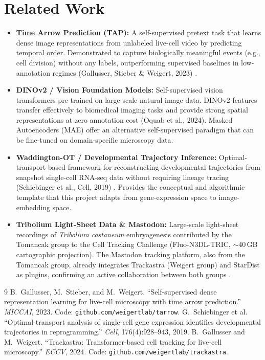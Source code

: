 \documentclass{article}
\begin{document}
\section*{Related Work}
\begin{itemize}
	\item \textbf{Time Arrow Prediction (TAP):} A self-supervised pretext task that learns dense image representations from unlabeled live-cell video by predicting temporal order. Demonstrated to capture biologically meaningful events (e.g., cell division) without any labels, outperforming supervised baselines in low-annotation regimes (Gallusser, Stieber \& Weigert, 2023) \cite{tap}.
	\item \textbf{DINOv2 / Vision Foundation Models:} Self-supervised vision transformers pre-trained on large-scale natural image data. DINOv2 features transfer effectively to biomedical imaging tasks and provide strong spatial representations at zero annotation cost (Oquab et al., 2024). Masked Autoencoders (MAE) offer an alternative self-supervised paradigm that can be fine-tuned on domain-specific microscopy data.
	\item \textbf{Waddington-OT / Developmental Trajectory Inference:} Optimal-transport-based framework for reconstructing developmental trajectories from snapshot single-cell RNA-seq data without requiring lineage tracing (Schiebinger et al., Cell, 2019) \cite{wot}. Provides the conceptual and algorithmic template that this project adapts from gene-expression space to image-embedding space.
	\item \textbf{Tribolium Light-Sheet Data \& Mastodon:} Large-scale light-sheet recordings of \textit{Tribolium castaneum} embryogenesis contributed by the Tomancak group to the Cell Tracking Challenge (Fluo-N3DL-TRIC, $\sim$40\,GB cartographic projection). The Mastodon tracking platform, also from the Tomancak group, already integrates Trackastra (Weigert group) and StarDist as plugins, confirming an active collaboration between both groups \cite{trackastra}.
\end{itemize}

\begin{thebibliography}{9}
	 B.~Gallusser, M.~Stieber, and M.~Weigert. ``Self-supervised dense representation learning for live-cell microscopy with time arrow prediction.'' \textit{MICCAI}, 2023. Code: \texttt{github.com/weigertlab/tarrow}.
	 G.~Schiebinger et al. ``Optimal-transport analysis of single-cell gene expression identifies developmental trajectories in reprogramming.'' \textit{Cell}, 176(4):928--943, 2019.
	 B.~Gallusser and M.~Weigert. ``Trackastra: Transformer-based cell tracking for live-cell microscopy.'' \textit{ECCV}, 2024. Code: \texttt{github.com/weigertlab/trackastra}.
\end{thebibliography}
\end{document}
